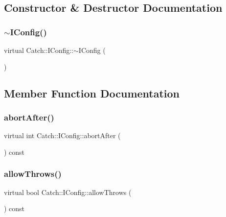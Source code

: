 \subsection{Constructor \& Destructor Documentation}
\mbox{\label{struct_catch_1_1_i_config_adadf7c57478e4b0c83bea5b38d2dbc87}} 
\subsubsection{$\sim$IConfig()}
{\footnotesize\ttfamily virtual Catch\+::\+I\+Config\+::$\sim$\+I\+Config (\begin{DoxyParamCaption}{ }\end{DoxyParamCaption})\hspace{0.3cm}{\ttfamily [virtual]}}



\subsection{Member Function Documentation}
\mbox{\label{struct_catch_1_1_i_config_a363f3388a439d02217f37198eff96744}} 
\subsubsection{abortAfter()}
{\footnotesize\ttfamily virtual int Catch\+::\+I\+Config\+::abort\+After (\begin{DoxyParamCaption}{ }\end{DoxyParamCaption}) const\hspace{0.3cm}{\ttfamily [pure virtual]}}

\mbox{\label{struct_catch_1_1_i_config_aadb95f849359de1e6eb915aab063e542}} 
\subsubsection{allowThrows()}
{\footnotesize\ttfamily virtual bool Catch\+::\+I\+Config\+::allow\+Throws (\begin{DoxyParamCaption}{ }\end{DoxyParamCaption}) const\hspace{0.3cm}{\ttfamily [pure virtual]}}

